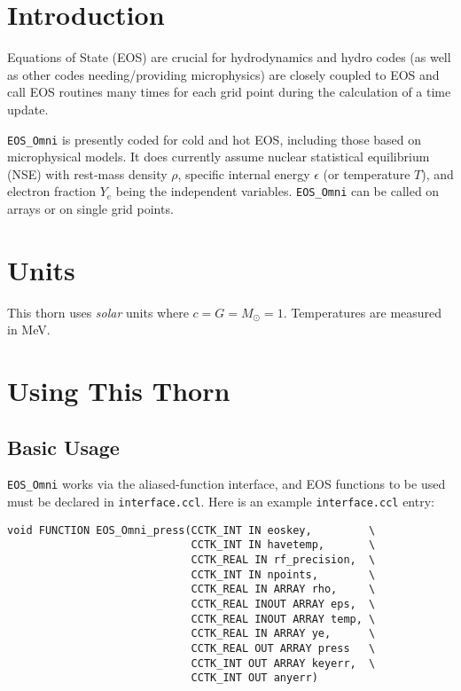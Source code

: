\section{Introduction}

Equations of State (EOS) are crucial for hydrodynamics and hydro
codes (as well as other codes needing/providing microphysics)
are closely coupled to EOS and call EOS routines many times for
each grid point during the calculation of a time update.

\texttt{EOS\_Omni} is presently coded for cold and hot EOS, including
those based on microphysical models. It does currently assume nuclear
statistical equilibrium (NSE) with rest-mass density $\rho$, specific
internal energy $\epsilon$ (or temperature $T$), and electron fraction
$Y_e$ being the independent variables. \texttt{EOS\_Omni} can be
called on arrays or on single grid points.



\section{Units}

This thorn uses \emph{solar} units where $c = G = M_{\odot} = 1$.
Temperatures are measured in MeV.

\section{Using This Thorn}

\subsection{Basic Usage}

\texttt{EOS\_Omni} works via the aliased-function interface, and
EOS functions to be used must be declared in \texttt{interface.ccl}.
Here is an example \texttt{interface.ccl} entry:
\begin{verbatim}
void FUNCTION EOS_Omni_press(CCTK_INT IN eoskey,         \
                             CCTK_INT IN havetemp,       \
                             CCTK_REAL IN rf_precision,  \
                             CCTK_INT IN npoints,        \
                             CCTK_REAL IN ARRAY rho,     \
                             CCTK_REAL INOUT ARRAY eps,  \
                             CCTK_REAL INOUT ARRAY temp, \
                             CCTK_REAL IN ARRAY ye,      \
                             CCTK_REAL OUT ARRAY press   \
                             CCTK_INT OUT ARRAY keyerr,  \
                             CCTK_INT OUT anyerr)
\end{verbatim}

